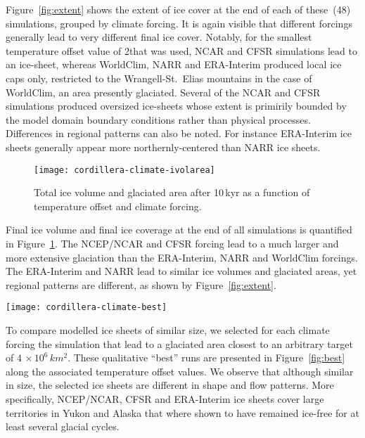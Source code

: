 Figure~\ref{fig:extent} shows the extent of ice cover at the end of each of these~(48) simulations, grouped by climate forcing. It is again visible that different forcings generally lead to very different final ice cover. Notably, for the smallest temperature offset value of 2\degC that was used, NCAR and CFSR simulations lead to an ice-sheet, whereas WorldClim, NARR and ERA-Interim produced local ice caps only, restricted to the Wrangell-St.~Elias mountains in the case of WorldClim, an area presently glaciated. Several of the NCAR and CFSR simulations produced oversized ice-sheets whose extent is primirily bounded by the model domain boundary conditions rather than physical processes. Differences in regional patterns can also be noted. For instance ERA-Interim ice sheets generally appear more northernly-centered than NARR ice sheets.

\begin{figure}[t]
	\vspace*{2mm}
	\begin{center}
		\texttt{[image: cordillera-climate-ivolarea]}
	\end{center}
	\caption{Total ice volume and glaciated area after 10\,kyr as a function of temperature offset and climate forcing.}
	\label{fig:ivolarea}
\end{figure}

Final ice volume and final ice coverage at the end of all simulations is quantified in Figure~\ref{fig:ivolarea}. The NCEP/NCAR and CFSR forcing lead to a much larger and more extensive glaciation than the ERA-Interim, NARR and WorldClim forcings. The ERA-Interim and NARR lead to similar ice volumes and glaciated areas, yet regional patterns are different, as shown by Figure~\ref{fig:extent}.

\begin{figure*}[t]
	\vspace*{2mm}
	\begin{center}
		\texttt{[image: cordillera-climate-best]}
	\end{center}
	\caption{Ice surface topography (black contours every 1000\,m) and velocity (\unit{m\,yr^{-1}}) after 10\,kyr using temperature offsets that lead to similar areas of ice cover for each climate forcing.}
	\label{fig:best}
\end{figure*}

To compare modelled ice sheets of similar size, we selected for each climate forcing the simulation that lead to a glaciated area closest to an arbitrary target of $4\,\times10^6\,\unit{km^2}$. These qualitative ``best'' runs are presented in Figure~\ref{fig:best} along the associated temperature offset values. We observe that although similar in size, the selected ice sheets are different in shape and flow patterns. More specifically, NCEP/NCAR, CFSR and ERA-Interim ice sheets cover large territories in Yukon and Alaska that where shown to have remained ice-free for at least several glacial cycles\citep{dukrodkin-1999,kaufman-manley-2004}.

